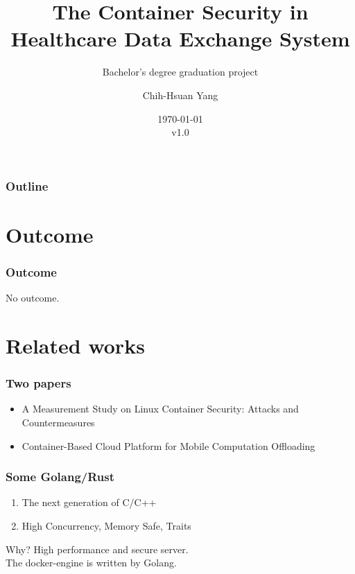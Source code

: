 \documentclass{beamer}
\title{The Container Security in Healthcare Data Exchange System}
\subtitle{Bachelor's degree graduation project}
\author{Chih-Hsuan Yang}
\institute{National Sun Yat-sen University}
\date{\today\\v1.0}
\begin{document}
\begin{CJK*}{UTF8}{bsmi}

    \begin{frame}
        \titlepage
    \end{frame}

    \begin{frame}
        \frametitle{Outline}
        \tableofcontents
    \end{frame}

    \section{Outcome}
    \begin{frame}
        \frametitle{Outcome}
        \centering \Large {No outcome.}
    \end{frame}



    \section{Related works}
    \begin{frame}
        \frametitle{Two papers}
        \begin{itemize}
            \item A Measurement Study on Linux Container Security: Attacks and Countermeasures\cite{Measurement}
            \item Container-Based Cloud Platform for Mobile Computation Offloading\cite{Offloading}
        \end{itemize}
    \end{frame}

    \begin{frame}
        \frametitle{Some Golang/Rust}
        \begin{enumerate}
            \item The next generation of C/C++
            \item High Concurrency, Memory Safe, Traits
        \end{enumerate}
        \begin{block}{Why?}
            High performance and secure server.\\
            The docker-engine is written by Golang.
        \end{block}
    \end{frame}


\end{CJK*}
\end{document}
